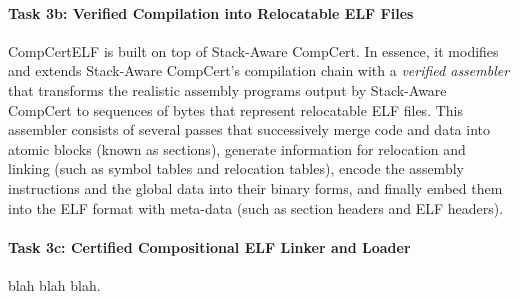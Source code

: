 \paragraph*{Task 3b: Verified Compilation into Relocatable ELF Files}
CompCertELF is built on top of Stack-Aware CompCert. In essence, it
modifies and extends Stack-Aware CompCert's compilation chain with a
\emph{verified assembler} that transforms the realistic assembly
programs output by Stack-Aware CompCert to sequences of bytes that
represent relocatable ELF files.
This assembler consists of several passes that successively merge code
and data into atomic blocks (known as sections), generate information for
relocation and linking (such as symbol tables and relocation tables),
encode the assembly instructions and the global data into their binary forms,
and finally embed them into the ELF format with meta-data (such as section
headers and ELF headers).

\paragraph*{Task 3c: Certified Compositional ELF Linker and Loader}
blah blah blah.

   
   
